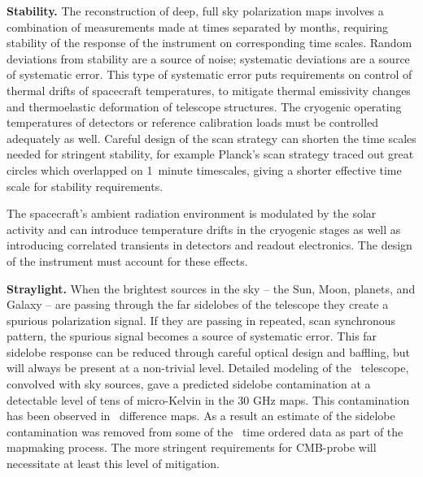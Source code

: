 \textbf{Stability.}  %
The reconstruction of deep, full sky polarization maps involves a combination of measurements made at times
separated by months, requiring stability of the response of the instrument on corresponding time scales.  Random deviations
from stability are a source of noise; systematic deviations are a source of systematic error. 
This type of systematic error puts requirements on control of thermal drifts of spacecraft temperatures, to
mitigate thermal emissivity changes and thermoelastic deformation of telescope structures.  
The cryogenic operating temperatures of detectors or reference calibration loads must be controlled
adequately as well. Careful design of the scan strategy can shorten the time
scales needed for stringent stability, for example Planck's scan strategy traced out great circles which overlapped on
1~minute timescales, giving a shorter effective time scale for stability requirements. 

The spacecraft's ambient radiation environment is modulated by the solar activity and
can introduce temperature drifts in the cryogenic stages as well as
introducing correlated transients in detectors and readout electronics.  The design of the instrument must 
account for these effects.

\textbf{Straylight.}   When the brightest sources in the sky -- the Sun, Moon, planets, and Galaxy --
are passing through the far sidelobes of the telescope they create a spurious polarization signal. If they are 
passing in repeated, scan synchronous pattern, the spurious signal becomes a source of systematic error. 
This far sidelobe response can be reduced through careful optical design and baffling, but will always be present 
at a non-trivial level.  Detailed modeling of the \planck\ telescope, convolved with sky sources, gave 
a predicted sidelobe contamination at a detectable level of tens of micro-Kelvin in the 30 GHz maps.  This
contamination has been observed in \planck\ difference maps.  
As a result an estimate of the sidelobe contamination was removed from some of the \planck\ time ordered data 
as part of the mapmaking process. The more stringent requirements for CMB-probe will necessitate at least 
this level of mitigation.  


